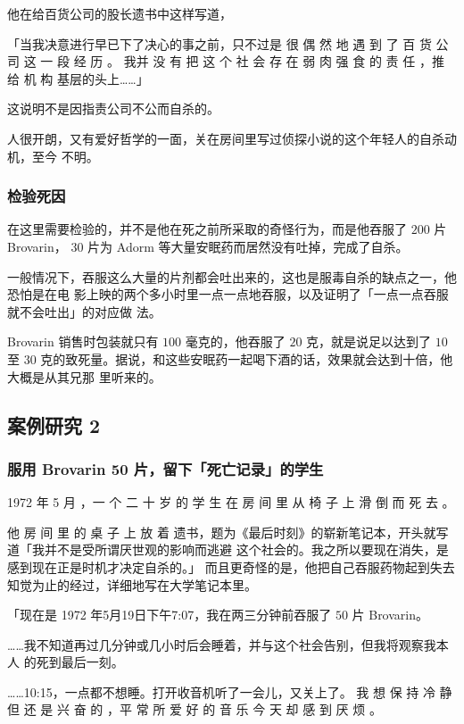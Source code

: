 \documentclass[UTF8]{ctexart}
\begin{document}
他在给百货公司的股长遗书中这样写道，

「当我决意进行早已下了决心的事之前，只不过是 很 偶 然 地 遇 到 了 百 货 公 司 这 一 段 经 历 。
我并 没 有 把 这 个 社 会 存 在 弱 肉 强 食 的 责 任 ，推 给 机 构 基层的头上……」

这说明不是因指责公司不公而自杀的。

人很开朗，又有爱好哲学的一面，关在房间里写过侦探小说的这个年轻人的自杀动机，至今 不明。

\subsubsection*{检验死因}

在这里需要检验的，并不是他在死之前所采取的奇怪行为，而是他吞服了 $200$ 片 Brovarin，
$30$ 片为 Adorm 等大量安眠药而居然没有吐掉，完成了自杀。

一般情况下，吞服这么大量的片剂都会吐出来的，这也是服毒自杀的缺点之一，他恐怕是在电
影上映的两个多小时里一点一点地吞服，以及证明了「一点一点吞服就不会吐出」的对应做
法。

Brovarin 销售时包装就只有 $100$ 毫克的，他吞服了 $20$ 克，就是说足以达到了 $10$ 至 $30$
克的致死量。据说，和这些安眠药一起喝下酒的话，效果就会达到十倍，他大概是从其兄那
里听来的。

\subsection{案例研究 2}

\subsubsection*{服用 Brovarin 50 片，留下「死亡记录」的学生}

1972 年 5 月 ，一 个 二 十 岁 的 学 生 在 房 间 里 从 椅 子 上 滑 倒 而 死 去 。

他 房 间 里 的 桌 子 上 放 着 遗书，题为《最后时刻》的崭新笔记本，开头就写道「我并不是受所谓厌世观的影响而逃避 这个社会的。我之所以要现在消失，是感到现在正是时机才决定自杀的。」 而且更奇怪的是，他把自己吞服药物起到失去知觉为止的经过，详细地写在大学笔记本里。

「现在是 1972 年5月19日下午7:07，我在两三分钟前吞服了 $50$ 片 Brovarin。

……我不知道再过几分钟或几小时后会睡着，并与这个社会告别，但我将观察我本人 的死到最后一刻。

……10:15，一点都不想睡。打开收音机听了一会儿，又关上了。 我 想 保 持 冷 静 但 还 是 兴 奋 的 ，平 常 所 爱 好 的 音 乐 今 天 却 感 到 厌 烦 。
\end{document}
